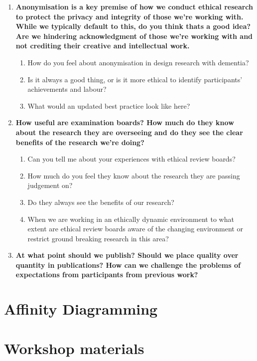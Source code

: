 \begin{enumerate}
    \item \textbf{Anonymisation is a key premise of how we conduct ethical research to protect the privacy and integrity of those we’re working with. While we typically default to this, do you think thats a good idea? Are we hindering acknowledgment of those we’re working with and not crediting their creative and intellectual work.}
    \begin{enumerate}
        \item How do you feel about anonymisation in design research with dementia?
        \item Is it always a good thing, or is it more ethical to identify participants’ achievements and labour?
        \item What would an updated best practice look like here?
    \end{enumerate}

    \item \textbf{How useful are examination boards? How much do they know about the research they are overseeing and do they see the clear benefits of the research we’re doing?}
    \begin{enumerate}
        \item Can you tell me about your experiences with ethical review boards?
        \item How much do you feel they know about the research they are passing judgement on?
        \item Do they always see the benefits of our research?
        \item When we are working in an ethically dynamic environment to what extent are ethical review boards aware of the changing environment or restrict ground breaking research in this area?
    \end{enumerate}
 
    \item \textbf{At what point should we publish? Should we place quality over quantity in publications? How can we challenge the problems of expectations from participants from previous work?}
\end{enumerate}

\section{Affinity Diagramming}
\label{app:AD}

\section{Workshop materials}
\label{app:ToolkitMaterials}